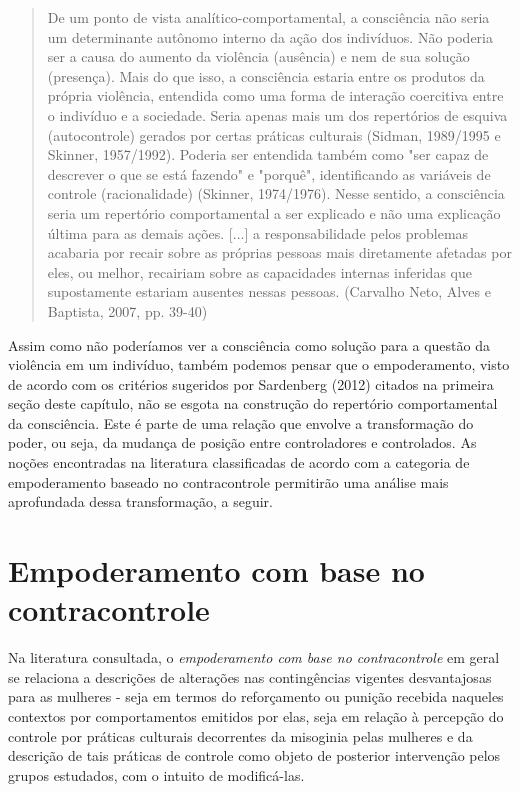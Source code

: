 \begin{quote}
    De um ponto de vista analítico-comportamental, a consciência não seria um determinante autônomo interno da ação dos indivíduos. Não poderia ser a causa do aumento da violência (ausência) e nem de sua solução (presença). Mais do que isso, a consciência estaria entre os produtos da própria violência, entendida como uma forma de interação coercitiva entre o indivíduo e a sociedade. Seria apenas mais um dos repertórios de esquiva (autocontrole) gerados por certas práticas culturais (Sidman, 1989/1995 e Skinner, 1957/1992). Poderia ser entendida também como "ser capaz de descrever o que se está fazendo" e "porquê", identificando as variáveis de controle (racionalidade) (Skinner, 1974/1976). Nesse sentido, a consciência seria um repertório comportamental a ser explicado e não uma explicação última para as demais ações. [...] a responsabilidade pelos problemas acabaria por recair sobre as próprias pessoas mais diretamente afetadas por eles, ou melhor, recairiam sobre as capacidades internas inferidas que supostamente estariam ausentes nessas pessoas. (Carvalho Neto, Alves e Baptista, 2007, pp. 39-40)
\end{quote}

Assim como não poderíamos ver a consciência como solução para a questão da violência em um indivíduo, também podemos pensar que o empoderamento, visto de acordo com os critérios sugeridos por Sardenberg (2012) citados na primeira seção deste capítulo, não se esgota na construção do repertório comportamental da consciência. Este é parte de uma relação que envolve a transformação do poder, ou seja, da mudança de posição entre controladores e controlados. As noções encontradas na literatura classificadas de acordo com a categoria de empoderamento baseado no contracontrole permitirão uma análise mais aprofundada dessa transformação, a seguir.

\section{Empoderamento com base no contracontrole}

Na literatura consultada, o \textit{empoderamento com base no contracontrole} em geral se relaciona a descrições de alterações nas contingências vigentes desvantajosas para as mulheres - seja em termos do reforçamento ou punição recebida naqueles contextos por comportamentos emitidos por elas, seja em relação à percepção do controle por práticas culturais decorrentes da misoginia pelas mulheres e da descrição de tais práticas de controle como objeto de posterior intervenção pelos grupos estudados, com o intuito de modificá-las.

